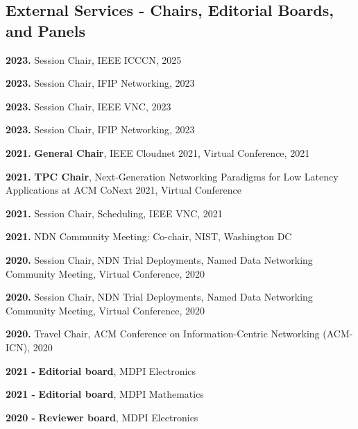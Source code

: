 \subsection{External Services - Chairs, Editorial Boards, and Panels}
\begin{cvlist}
    \item \textbf{2023.} Session Chair, IEEE ICCCN, 2025
    \item \textbf{2023.} Session Chair, IFIP Networking, 2023
    \item \textbf{2023.} Session Chair, IEEE VNC, 2023
    \item \textbf{2023.} Session Chair, IFIP Networking, 2023
    \item \textbf{2021.} \textbf{General Chair}, IEEE Cloudnet 2021, Virtual Conference, 2021
    \item \textbf{2021.} \textbf{TPC Chair}, Next-Generation Networking Paradigms for Low Latency Applications at ACM CoNext 2021, Virtual Conference
    \item  \textbf{2021.} Session Chair, Scheduling, IEEE VNC, 2021
    \item \textbf{2021.} NDN Community Meeting: Co-chair, NIST, Washington DC
    \item \textbf{2020.} Session Chair, NDN Trial Deployments, Named Data Networking Community Meeting,  Virtual Conference, 2020
    \item \textbf{2020.} Session Chair, NDN Trial Deployments, Named Data Networking Community Meeting,  Virtual Conference, 2020
    \item \textbf{2020.} Travel Chair, ACM Conference on Information-Centric Networking  (ACM-ICN), 2020
 
    \item \textbf{2021 - } \textbf{Editorial board}, MDPI Electronics
    \item \textbf{2021 - } \textbf{Editorial board}, MDPI Mathematics
    \item \textbf{2020 - } \textbf{Reviewer board}, MDPI Electronics
\end{cvlist}


